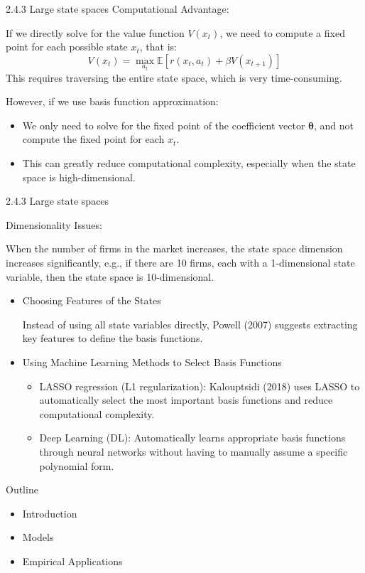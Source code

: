 \documentclass[aspectratio=169]{beamer}  %
\begin{document}
\begin{frame}
{2.4.3 Large state spaces}
Computational Advantage:

If we directly solve for the value function \( V(x_t) \), we need to compute a fixed point for each possible state \( x_t \), that is:
\[
V(x_t) = \max_{a_t} \mathbb{E}[r(x_t, a_t) + \beta V(x_{t+1})]
\]
This requires traversing the entire state space, which is very time-consuming.

However, if we use basis function approximation:
\begin{itemize}
    \item We only need to solve for the fixed point of the coefficient vector \( \boldsymbol{\theta} \), and not compute the fixed point for each \( x_t \).
    \item This can greatly reduce computational complexity, especially when the state space is high-dimensional.
\end{itemize}
\end{frame}


\begin{frame}
{2.4.3 Large state spaces}

Dimensionality Issues:

When the number of firms in the market increases, the state space dimension increases significantly, e.g., if there are 10 firms, each with a 1-dimensional state variable, then the state space is 10-dimensional.
\begin{itemize}
    \item Choosing Features of the States
    
    Instead of using all state variables directly, Powell (2007) suggests extracting key features to define the basis functions.
    \item Using Machine Learning Methods to Select Basis Functions
    \begin{itemize}
        \item LASSO regression (L1 regularization): Kalouptsidi (2018) uses LASSO to automatically select the most important basis functions and reduce computational complexity.
        \item Deep Learning (DL): Automatically learns appropriate basis functions through neural networks without having to manually assume a specific polynomial form.
    \end{itemize}
\end{itemize}
\end{frame}

\begin{frame}{Outline}
    \begin{itemize}
        \item Introduction
        \item Models
        \item Empirical Applications
    \end{itemize}
\end{frame}
\end{document}
